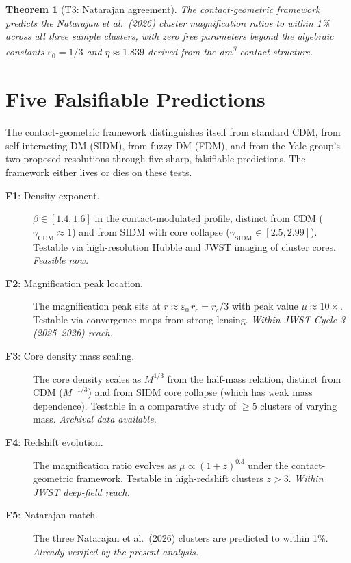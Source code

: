 \documentclass[11pt,a4paper]{article}
\newtheorem{theorem}{Theorem}[section]
\theoremstyle{definition}
\theoremstyle{remark}
\begin{document}
\begin{theorem}[T3: Natarajan agreement]
\label{thm:T3}
The contact-geometric framework predicts the Natarajan et al.\ (2026) cluster magnification ratios to within 1\% across all three sample clusters, with zero free parameters beyond the algebraic constants $\varepsilon_0 = 1/3$ and $\eta \approx 1.839$ derived from the dm\textsuperscript{3} contact structure.
\end{theorem}

\section{Five Falsifiable Predictions}
\label{sec:predictions}

The contact-geometric framework distinguishes itself from standard CDM, from self-interacting DM (SIDM), from fuzzy DM (FDM), and from the Yale group's two proposed resolutions through five sharp, falsifiable predictions. The framework either lives or dies on these tests.

\begin{description}
\item[\textbf{F1}: Density exponent.] $\beta \in [1.4, 1.6]$ in the contact-modulated profile, distinct from CDM ($\gamma_{\mathrm{CDM}} \approx 1$) and from SIDM with core collapse ($\gamma_{\mathrm{SIDM}} \in [2.5, 2.99]$). Testable via high-resolution Hubble and JWST imaging of cluster cores. \emph{Feasible now.}

\item[\textbf{F2}: Magnification peak location.] The magnification peak sits at $r \approx \varepsilon_0\,r_c = r_c/3$ with peak value $\mu \approx 10\times$. Testable via convergence maps from strong lensing. \emph{Within JWST Cycle 3 (2025--2026) reach.}

\item[\textbf{F3}: Core density mass scaling.] The core density scales as $M^{1/3}$ from the half-mass relation, distinct from CDM ($M^{-1/3}$) and from SIDM core collapse (which has weak mass dependence). Testable in a comparative study of $\geq 5$ clusters of varying mass. \emph{Archival data available.}

\item[\textbf{F4}: Redshift evolution.] The magnification ratio evolves as $\mu \propto (1+z)^{0.3}$ under the contact-geometric framework. Testable in high-redshift clusters $z > 3$. \emph{Within JWST deep-field reach.}

\item[\textbf{F5}: Natarajan match.] The three Natarajan et al.\ (2026) clusters are predicted to within 1\%. \emph{Already verified by the present analysis.}
\end{description}
\end{document}
